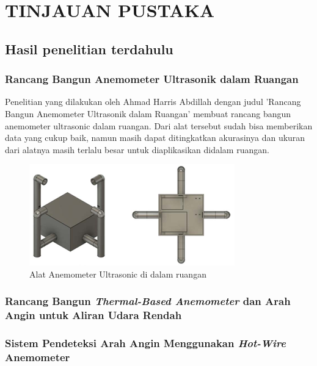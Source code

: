 \section{TINJAUAN PUSTAKA}

\subsection{Hasil penelitian terdahulu}
\subsubsection{Rancang Bangun Anemometer Ultrasonik dalam Ruangan}

Penelitian yang dilakukan oleh Ahmad Harris Abdillah dengan judul 'Rancang Bangun Anemometer Ultrasonik dalam Ruangan' \parencite{Newton1687} 
membuat rancang bangun anemometer ultrasonic dalam ruangan. Dari alat tersebut sudah bisa memberikan data yang cukup baik, namun masih dapat 
ditingkatkan akurasinya dan ukuran dari alatnya masih terlalu besar untuk diaplikasikan didalam ruangan.


\begin{figure}[h!]
	\label{abdillah_anemo_skema}
	\includegraphics[width=\linewidth]{gambar/fig_anemometer_abdillah_skema}
	\caption{Alat Anemometer Ultrasonic di dalam ruangan \parencite{Abdillah2022}}
\end{figure}

\subsubsection{Rancang Bangun \emph{Thermal-Based Anemometer} dan Arah Angin untuk Aliran Udara Rendah}

\subsubsection{Sistem Pendeteksi Arah Angin Menggunakan \textit{Hot-Wire} Anemometer}


